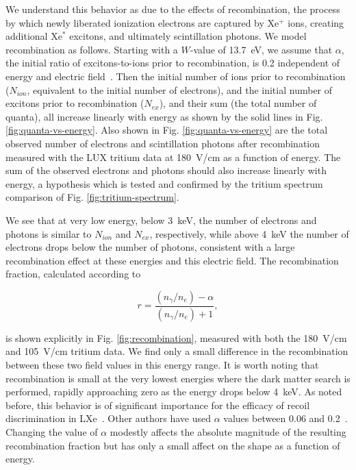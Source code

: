 We understand this behavior as due to the effects of recombination, the process by which newly liberated ionization electrons are captured by Xe$^+$ ions, creating additional Xe$^*$ excitons, and ultimately scintillation photons. We model recombination as follows. Starting with a $W$-value of 13.7~eV, we assume that $\alpha$, the initial ratio of excitons-to-ions prior to recombination, is 0.2 independent of energy and electric field~\cite{Doke_alpha}. Then the initial number of ions prior to recombination ($N_{ion}$, equivalent to the initial number of electrons), and the initial number of excitons prior to recombination ($N_{ex}$), and their sum (the total number of quanta), all increase linearly with energy as shown by the solid lines in Fig. \ref{fig:quanta-vs-energy}. Also shown in Fig. \ref{fig:quanta-vs-energy} are the total observed number of electrons and scintillation photons after recombination measured with the LUX tritium data at 180~V/cm as a function of energy. The sum of the observed electrons and photons should also increase linearly with energy, a hypothesis which is tested and confirmed by the tritium spectrum comparison of Fig. \ref{fig:tritium-spectrum}.

We see that at very low energy, below 3~keV, the number of electrons and photons is similar to $N_{ion}$ and $N_{ex}$, respectively, while above 4~keV the number of electrons drops below the number of photons, consistent with a large recombination effect at these energies and this electric field. The recombination fraction, calculated according to

\begin{equation}
r = \frac{(n_{\gamma}/n_e) - \alpha}{(n_{\gamma}/n_e) + 1},
\end{equation}

\noindent
is shown explicitly in Fig. \ref{fig:recombination}, measured with both the 180~V/cm and 105~V/cm tritium data. We find only a small difference in the recombination between these two field values in this energy range. It is worth noting that recombination is small at the very lowest energies where the dark matter search is performed, rapidly approaching zero as the energy drops below 4~keV. As noted before, this behavior is of significant importance for the efficacy of recoil discrimination in LXe~\cite{xed-discrimination}. Other authors have used $\alpha$ values between 0.06 and 0.2~\cite{kaixuan}. Changing the value of $\alpha$ modestly affects the absolute magnitude of the resulting recombination fraction but has only a small affect on the shape as a function of energy. 

